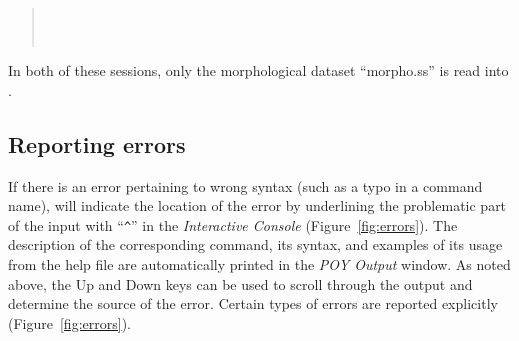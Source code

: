 {\begin{quote}
 	 \\
	 \\
\end{quote}

In both of these sessions, only the morphological dataset ``morpho.ss'' is read into \poy.

\subsection{Reporting errors}
If there is an error pertaining to wrong syntax (such as a typo in a command name), \poy will indicate the location of the error by underlining the problematic part of the input with ``\texttt{\^}'' in the \emph{Interactive Console} (Figure~\ref{fig:errors}). The description of the corresponding command, its syntax, and examples of its usage from the help file are automatically printed in the \emph{POY Output} window. As noted above, the Up and Down keys can be used to scroll through the output and determine the source of the error. Certain types of errors are reported explicitly (Figure~\ref{fig:errors}).

}
